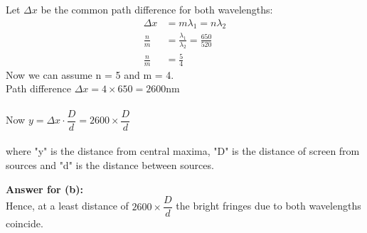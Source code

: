 \documentclass[journal,12pt,twocolumn]{IEEEtran}
\theoremstyle{remark}
\begin{document}
Let $\Delta x$  be the common path difference for both wavelengths:
\begin{align}
\Delta x &= m \lambda_1 = n\lambda_2 \\
\frac{n}{m} &= \frac{\lambda_1}{\lambda_2} = \frac{650}{520}\\
\frac{n}{m} &= \frac{5}{4}
\end{align}
Now we can assume n = 5 and m = 4.\\
Path difference $\Delta x = 4\times650 = 2600 \text{nm}$\\\\
Now $y = \Delta x\cdot \dfrac{D}{d} = 2600\times \dfrac{D}{d}$\\\\
where "y" is the distance from central maxima, "D" is the distance of screen from sources and "d" is the distance between sources.

\textbf{Answer for (b):}
\\
Hence, at a least distance of $2600\times\dfrac{D}{d}$ the bright fringes due to  both wavelengths coincide.
\end{document}
